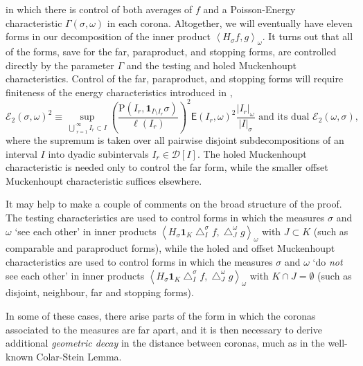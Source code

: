 \documentclass{amsart}%
\theoremstyle{plain}
\numberwithin{equation}{section}
\begin{document}
in which there is control of both averages of $f$ and a Poisson-Energy
characteristic $\Gamma\left(  \sigma,\omega\right)  $ in each corona.
Altogether, we will eventually have eleven forms in our decomposition of the
inner product $\left\langle H_{\sigma}f,g\right\rangle _{\omega}$. It turns
out that all of the forms, save for the far, paraproduct, and stopping forms,
are controlled directly by the parameter $\Gamma$ and the testing and holed
Muckenhoupt characteristics. Control of the far, paraproduct, and stopping
forms will require finiteness of the energy characteristics introduced in
\cite{LaSaUr2},%
\begin{equation}
\mathcal{E}_{2}\left(  \sigma,\omega\right)  ^{2}\equiv\sup_{\overset{\cdot
}{\bigcup}_{r=1}^{\infty}I_{r}\subset I}\left(  \frac{\mathrm{P}\left(
I_{r},\mathbf{1}_{I\setminus I_{r}}\sigma\right)  }{\ell\left(  I_{r}\right)
}\right)  ^{2}\mathsf{E}\left(  I_{r},\omega\right)  ^{2}\frac{\left\vert
I_{r}\right\vert _{\omega}}{\left\vert I\right\vert _{\sigma}}\text{ and its
dual }\mathcal{E}_{2}\left(  \omega,\sigma\right)  ,\label{energy char}%
\end{equation}
where the supremum is taken over all pairwise disjoint subdecompositions of an
interval $I$ into dyadic subintervals $I_{r}\in\mathcal{D}\left[  I\right]  $.
The holed Muckenhoupt characteristic is needed only to control the far form,
while the smaller offset Muckenhoupt characteristic suffices elsewhere.

It may help to make a couple of comments on the broad structure of the proof.
The testing characteristics are used to control forms in which the measures
$\sigma$ and $\omega$ `see each other' in inner products $\left\langle
H_{\sigma}\mathbf{1}_{K}\bigtriangleup_{I}^{\sigma}f,\bigtriangleup
_{J}^{\omega}g\right\rangle _{\omega}$ with $J\subset K$ (such as comparable
and paraproduct forms), while the holed and offset Muckenhoupt characteristics
are used to control forms in which the measures $\sigma$ and $\omega$ `do
\emph{not} see each other' in inner products $\left\langle H_{\sigma
}\mathbf{1}_{K}\bigtriangleup_{I}^{\sigma}f,\bigtriangleup_{J}^{\omega
}g\right\rangle _{\omega}$ with $K\cap J=\emptyset$ (such as disjoint,
neighbour, far and stopping forms).

In some of these cases, there arise parts of the form in which the coronas
associated to the measures are far apart, and it is then necessary to derive
additional \emph{geometric decay} in the distance between coronas, much as in
the well-known Colar-Stein Lemma.
\end{document}
